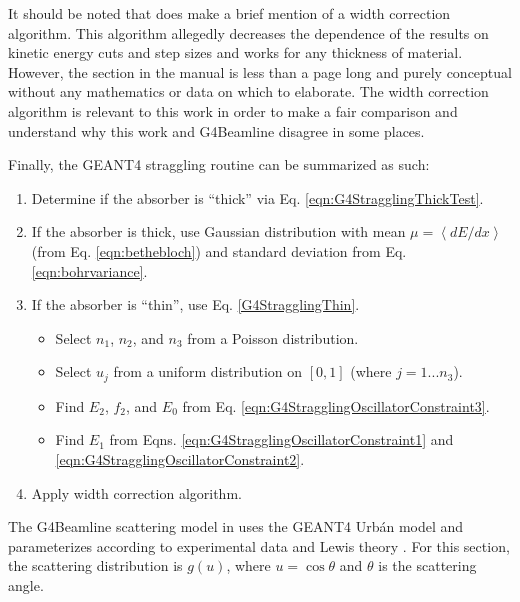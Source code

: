 It should be noted that \cite{geant4} does make a brief mention of a width correction algorithm. This algorithm allegedly decreases the dependence of the results on kinetic energy cuts and step sizes and works for any thickness of material. However, the section in the manual is less than a page long and purely conceptual without any mathematics or data on which to elaborate. The width correction algorithm is relevant to this work in order to make a fair comparison and understand why this work and G4Beamline disagree in some places.

Finally, the GEANT4 straggling routine can be summarized as such:
\begin{enumerate}
\item{Determine if the absorber is ``thick'' via Eq. \eqref{eqn:G4StragglingThickTest}.}
\item{If the absorber is thick, use Gaussian distribution with mean $\mu = \left<dE/dx\right>$ (from Eq. \eqref{eqn:bethebloch}) and standard deviation from Eq. \eqref{eqn:bohrvariance}.}
\item{If the absorber is ``thin'', use Eq. \eqref{G4StragglingThin}.
	\begin{itemize}
	\item{Select $n_1$, $n_2$, and $n_3$ from a Poisson distribution.}
	\item{Select $u_j$ from a uniform distribution on $[0,1]$ (where $j=1...n_3$).}
	\item{Find $E_2$, $f_2$, and $E_0$ from Eq. \eqref{eqn:G4StragglingOscillatorConstraint3}.} 
	\item{Find $E_1$ from Eqns. \ref{eqn:G4StragglingOscillatorConstraint1} and \ref{eqn:G4StragglingOscillatorConstraint2}.}
	\end{itemize}
	}
\item{Apply width correction algorithm.}
\end{enumerate}
 \label{sec:g4blscattering}\par
The G4Beamline scattering model in \cite{g4bl} uses the GEANT4 Urb\'{a}n model \cite{geant4} and parameterizes according to experimental data and Lewis theory \cite{lewis}. For this section, the scattering distribution is $g(u)$, where $u=\cos\theta$ and $\theta$ is the scattering angle.

